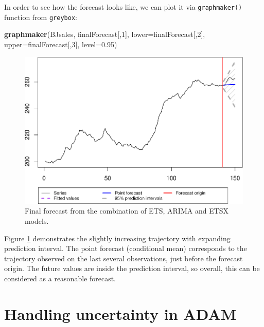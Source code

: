 \documentclass[]{book}
\newenvironment{Shaded}{\begin{snugshade}}{\end{snugshade}}
\newcommand{\DataTypeTok}[1]{\textcolor[rgb]{0.13,0.29,0.53}{#1}}
\newcommand{\DecValTok}[1]{\textcolor[rgb]{0.00,0.00,0.81}{#1}}
\newcommand{\FloatTok}[1]{\textcolor[rgb]{0.00,0.00,0.81}{#1}}
\newcommand{\KeywordTok}[1]{\textcolor[rgb]{0.13,0.29,0.53}{\textbf{#1}}}
\newcommand{\NormalTok}[1]{#1}
\theoremstyle{definition}
\theoremstyle{definition}
\theoremstyle{definition}
\theoremstyle{definition}
\theoremstyle{remark}
\begin{document}
In order to see how the forecast looks like, we can plot it via \texttt{graphmaker()} function from \texttt{greybox}:

\begin{Shaded}
\begin{Highlighting}[]
\KeywordTok{graphmaker}\NormalTok{(BJsales, finalForecast[,}\DecValTok{1}\NormalTok{],}
           \DataTypeTok{lower=}\NormalTok{finalForecast[,}\DecValTok{2}\NormalTok{], }\DataTypeTok{upper=}\NormalTok{finalForecast[,}\DecValTok{3}\NormalTok{],}
           \DataTypeTok{level=}\FloatTok{0.95}\NormalTok{)}
\end{Highlighting}
\end{Shaded}

\begin{figure}
\centering
\includegraphics{Svetunkov--2022----ADAM_files/figure-latex/adamCombinedfinalForecast-1.pdf}
\caption{\label{fig:adamCombinedfinalForecast}Final forecast from the combination of ETS, ARIMA and ETSX models.}
\end{figure}

Figure \ref{fig:adamCombinedfinalForecast} demonstrates the slightly increasing trajectory with expanding prediction interval. The point forecast (conditional mean) corresponds to the trajectory observed on the last several observations, just before the forecast origin. The future values are inside the prediction interval, so overall, this can be considered as a reasonable forecast.

\hypertarget{ADAMUncertainty}{%
\chapter{Handling uncertainty in ADAM}\label{ADAMUncertainty}}
\end{document}
